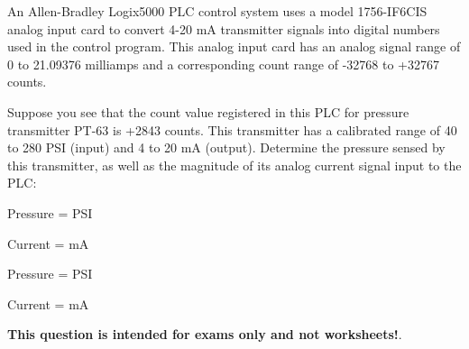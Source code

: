 

An Allen-Bradley Logix5000 PLC control system uses a model 1756-IF6CIS analog input card to convert 4-20 mA transmitter signals into digital numbers used in the control program.  This analog input card has an analog signal range of 0 to 21.09376 milliamps and a corresponding count range of -32768 to +32767 counts.

\vskip 10pt

Suppose you see that the count value registered in this PLC for pressure transmitter PT-63 is +2843 counts.  This transmitter has a calibrated range of 40 to 280 PSI (input) and 4 to 20 mA (output).  Determine the pressure sensed by this transmitter, as well as the magnitude of its analog current signal input to the PLC:

\vskip 10pt

Pressure = \underbar{\hskip 50pt} PSI

\vskip 10pt

Current = \underbar{\hskip 50pt} mA







Pressure =  PSI

\vskip 5pt

Current =  mA







{\bf This question is intended for exams only and not worksheets!}.



